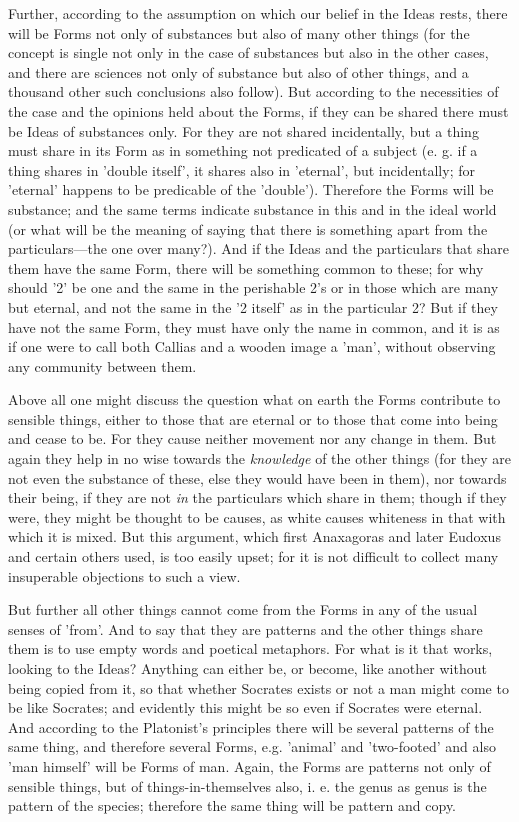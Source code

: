 Further, according to the assumption on which our belief in the Ideas rests, there will be Forms not only of substances but also of many other things (for the concept is single not only in the case of substances but also in the other cases, and there are sciences not only of substance but also of other things, and a thousand other such conclusions also follow). But according to the necessities of the case and the opinions held about the Forms, if they can be shared there must be Ideas of substances only. For they are not shared incidentally, but a thing must share in its Form as in something not predicated of a subject (e. g. if a thing shares in 'double itself', it shares also in 'eternal', but incidentally; for 'eternal' happens to be predicable of the 'double'). Therefore the Forms will be substance; and the same terms indicate substance in this and in the ideal world (or what will be the meaning of saying that there is something apart from the particulars—the one over many?). And if the Ideas and the particulars that share them have the same Form, there will be something common to these; for why should '2' be one and the same in the perishable 2's or in those which are many but eternal, and not the same in the '2 itself' as in the particular 2? But if they have not the same Form, they must have only the name in common, and it is as if one were to call both Callias and a wooden image a 'man', without observing any community between them.

Above all one might discuss the question what on earth the Forms contribute to sensible things, either to those that are eternal or to those that come into being and cease to be. For they cause neither movement nor any change in them. But again they help in no wise towards the \emph{knowledge} of the other things (for they are not even the substance of these, else they would have been in them), nor towards their being, if they are not \emph{in} the particulars which share in them; though if they were, they might be thought to be causes, as white causes whiteness in that with which it is mixed. But this argument, which first Anaxagoras and later Eudoxus and certain others used, is too easily upset; for it is not difficult to collect many insuperable objections to such a view.

But further all other things cannot come from the Forms in any of the usual senses of 'from'. And to say that they are patterns and the other things share them is to use empty words and poetical metaphors. For what is it that works, looking to the Ideas? Anything can either be, or become, like another without being copied from it, so that whether Socrates exists or not a man might come to be like Socrates; and evidently this might be so even if Socrates were eternal. And according to the Platonist's principles there will be several patterns of the same thing, and therefore several Forms, e.g. 'animal' and 'two-footed' and also 'man himself' will be Forms of man. Again, the Forms are patterns not only of sensible things, but of things-in-themselves also, i. e. the genus as genus is the pattern of the species; therefore the same thing will be pattern and copy.

